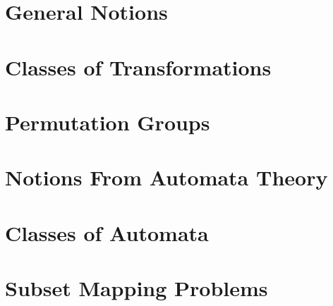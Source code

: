 
\chapter{General Notions}
\label{chap:prelim}



\chapter{Classes of Transformations}
\label{chap:class-transformations}



\chapter{Permutation Groups}
\label{prelim:sec:permgrp}



\chapter{Notions From Automata Theory}
\label{prelim:sec:automata}



\chapter{Classes of Automata}
\label{chap:classes_aut}



\chapter{Subset Mapping Problems}
\label{chap:prelim_complexity_results}

